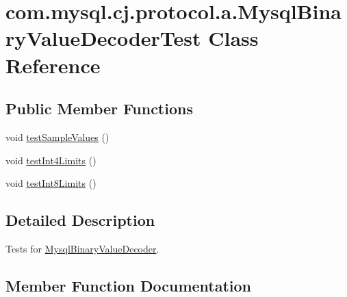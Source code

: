 \hypertarget{classcom_1_1mysql_1_1cj_1_1protocol_1_1a_1_1_mysql_binary_value_decoder_test}{}\section{com.\+mysql.\+cj.\+protocol.\+a.\+Mysql\+Binary\+Value\+Decoder\+Test Class Reference}
\label{classcom_1_1mysql_1_1cj_1_1protocol_1_1a_1_1_mysql_binary_value_decoder_test}
\subsection*{Public Member Functions}
\begin{DoxyCompactItemize}
\item 
void \mbox{\hyperlink{classcom_1_1mysql_1_1cj_1_1protocol_1_1a_1_1_mysql_binary_value_decoder_test_a9e3bd4549052927f558adc3104ff8ecf}{test\+Sample\+Values}} ()
\item 
void \mbox{\hyperlink{classcom_1_1mysql_1_1cj_1_1protocol_1_1a_1_1_mysql_binary_value_decoder_test_aa3091225072ba24e8fb4ac55370be682}{test\+Int4\+Limits}} ()
\item 
void \mbox{\hyperlink{classcom_1_1mysql_1_1cj_1_1protocol_1_1a_1_1_mysql_binary_value_decoder_test_aaaf3824628e10b446d5b66599f602820}{test\+Int8\+Limits}} ()
\end{DoxyCompactItemize}


\subsection{Detailed Description}
Tests for \mbox{\hyperlink{classcom_1_1mysql_1_1cj_1_1protocol_1_1a_1_1_mysql_binary_value_decoder}{Mysql\+Binary\+Value\+Decoder}}. 

\subsection{Member Function Documentation}
\mbox{\label{classcom_1_1mysql_1_1cj_1_1protocol_1_1a_1_1_mysql_binary_value_decoder_test_aa3091225072ba24e8fb4ac55370be682}} 

